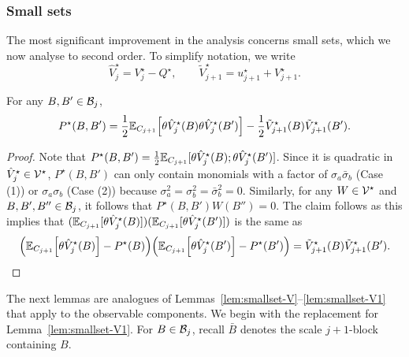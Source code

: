 \documentclass[11pt]{amsart}
\numberwithin{equation}{section}
\numberwithin{theorem}{section}
\newcommand{\1}{{\bf 1}}
\newcommand{\obs}{\star}
\newcommand{\Vobs}{V^\obs}
\newcommand{\uobs}{u^\obs}
\newcommand{\tVobs}{\tilde{V}^{\obs}}
\newcommand{\hVobs}{\hat V^\obs}
\begin{document}
\subsubsection{Small sets}


The most significant improvement in the analysis concerns small sets,
which we now analyse to second order. To simplify notation, we write
\begin{equation}
  \hVobs_j = \Vobs_j-Q^{\obs}, \qquad \tVobs_{j+1} = \uobs_{j+1}+\Vobs_{j+1}.
\end{equation}

\begin{lemma}
  \label{lem:Pjj+1}
  For any $B,B' \in \mathcal B_j$,
  \begin{equation} \label{e:Pjj+1}
    P^\obs(B,B') = \frac12
    \E_{C_{j+1}}\qB{\theta \hVobs_j(B)\theta \hVobs_j(B')}
    -\frac12 \tVobs_{j+1}(B)\tVobs_{j+1}(B')
    .
  \end{equation}
\end{lemma}
\begin{proof}
  Note that $P^{\obs}(B,B')=\frac{1}{2}\E_{C_{j+1}}\q{\theta \hVobs_{j}(B);\theta\hVobs_{j}(B')}$.
  Since it is quadratic in $\hVobs_j\in\cV^\obs$, $P^\obs(B,B')$ can
  only contain monomials with a factor of $\sigma_a\bar{\sigma}_b$
  (Case (1)) or $\sigma_a{\sigma_b}$ (Case (2)) because
  $\sigma_a^2=\sigma_b^2=\bar{\sigma}_{b}^{2}=0$.  Similarly, for any
  $W \in \cV^\obs$ and $B,B',B'' \in \mathcal B_j$, it follows that
  $P^\obs(B,B') W (B'')=0$.  The claim follows as this implies that
  $(\E_{C_{j+1}}[\theta \hVobs_j(B)])(\E_{C_{j+1}}[\theta \hVobs_j(B')])$
  is the same as
  \begin{equation}
    \pB{\E_{C_{j+1}}\qB{\theta \hVobs_j(B)} -P^\obs(B)}\pB{\E_{C_{j+1}}\qB{\theta\hVobs_j(B')} -P^\obs(B')}
    = \tVobs_{j+1}(B)\tVobs_{j+1}(B'). \qedhere
  \end{equation}
\end{proof}

The next lemmas are analogues of
Lemmas~\ref{lem:smallset-V}--\ref{lem:smallset-V1} that apply to
the observable components.
We begin with the replacement for Lemma~\ref{lem:smallset-V1}.
For $B\in \mathcal B_j$, recall $\bar{B}$ denotes the scale $j+1$-block containing $B$.
\end{document}
